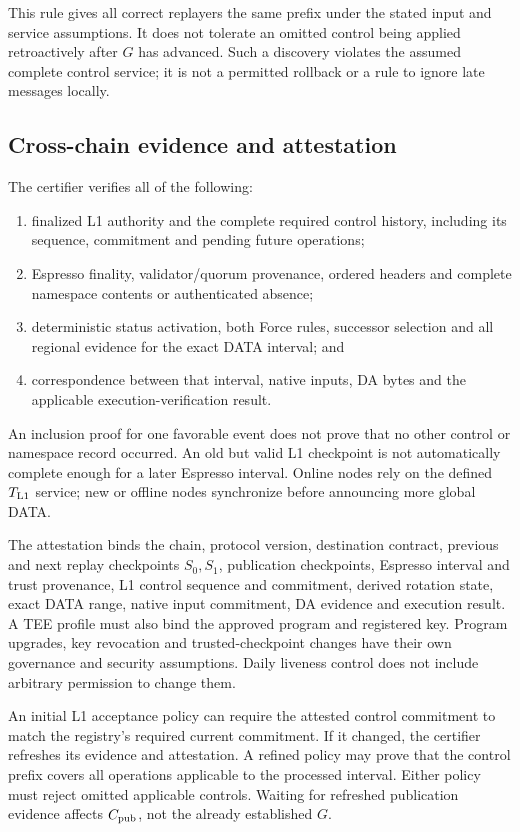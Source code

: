 \documentclass[11pt,a4paper]{article}
\begin{document}
This rule gives all correct replayers the same prefix under the stated
input and service assumptions. It does not tolerate an omitted control
being applied retroactively after $G$ has advanced. Such a discovery
violates the assumed complete control service; it is not a permitted
rollback or a rule to ignore late messages locally.

\subsection{Cross-chain evidence and attestation}
The certifier verifies all of the following:
\begin{enumerate}
\item finalized L1 authority and the complete required control history,
including its sequence, commitment and pending future operations;
\item Espresso finality, validator/quorum provenance, ordered headers
and complete namespace contents or authenticated absence;
\item deterministic status activation, both Force rules, successor
selection and all regional evidence for the exact DATA interval; and
\item correspondence between that interval, native inputs, DA bytes and
the applicable execution-verification result.
\end{enumerate}
An inclusion proof for one favorable event does not prove that no other
control or namespace record occurred. An old but valid L1 checkpoint
is not automatically complete enough for a later Espresso interval.
Online nodes rely on the defined $T_{\rm L1}$ service; new or offline
nodes synchronize before announcing more global DATA.

The attestation binds the chain, protocol version, destination contract,
previous and next replay checkpoints $S_0,S_1$, publication checkpoints,
Espresso interval and trust provenance,
L1 control sequence and commitment, derived rotation state, exact DATA
range, native input commitment, DA evidence and execution result. A TEE
profile must also bind the approved program and registered key. Program
upgrades, key revocation and trusted-checkpoint changes have their own
governance and security assumptions. Daily liveness control does not
include arbitrary permission to change them.

An initial L1 acceptance policy can require the attested control
commitment to match the registry's required current commitment.
If it changed, the certifier refreshes its evidence and attestation.
A refined policy may prove that the control prefix covers all operations
applicable to the processed interval. Either policy must reject omitted
applicable controls. Waiting for refreshed publication evidence affects
$C_{\rm pub}$, not the already established $G$.
\end{document}
